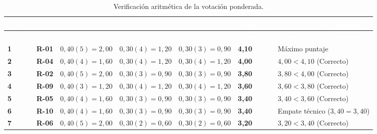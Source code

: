 \documentclass[12pt,a4paper]{article}
\newcommand{\cabecera}[1]{
    \textcolor{white}{\textbf{#1}}
}
\begin{document}
\begin{longtable}{
    C{1.2cm}
    C{1.2cm}
    C{2.1cm}
    C{2.1cm}
    C{2.1cm}
    C{1.6cm}
    C{3.3cm}
}

\caption{Verificación aritmética de la votación ponderada.}
\label{tab:verificacion-votacion}\\

\cabecera{Orden} &
\cabecera{ID} &
\cabecera{$0{,}40\,V$} &
\cabecera{$0{,}30\,R$} &
\cabecera{$0{,}30\,E$} &
\cabecera{Suma ($P$)} &
\cabecera{Estado de ordenamiento} \\

\endfirsthead

\cabecera{Orden} &
\cabecera{ID} &
\cabecera{$0{,}40\,V$} &
\cabecera{$0{,}30\,R$} &
\cabecera{$0{,}30\,E$} &
\cabecera{Suma ($P$)} &
\cabecera{Estado de ordenamiento} \\

\endhead

\bottomrule

\endfoot

\textbf{1} & \textbf{R-01} & $0{,}40(5) = 2{,}00$ & $0{,}30(4) = 1{,}20$ & $0{,}30(3) = 0{,}90$ & \textbf{4{,}10} & Máximo puntaje \\

\textbf{2} & \textbf{R-04} & $0{,}40(4) = 1{,}60$ & $0{,}30(4) = 1{,}20$ & $0{,}30(4) = 1{,}20$ & \textbf{4{,}00} & $4{,}00 < 4{,}10$ (Correcto) \\

\textbf{3} & \textbf{R-02} & $0{,}40(5) = 2{,}00$ & $0{,}30(3) = 0{,}90$ & $0{,}30(3) = 0{,}90$ & \textbf{3{,}80} & $3{,}80 < 4{,}00$ (Correcto) \\

\textbf{4} & \textbf{R-09} & $0{,}40(3) = 1{,}20$ & $0{,}30(4) = 1{,}20$ & $0{,}30(4) = 1{,}20$ & \textbf{3{,}60} & $3{,}60 < 3{,}80$ (Correcto) \\

\textbf{5} & \textbf{R-05} & $0{,}40(4) = 1{,}60$ & $0{,}30(3) = 0{,}90$ & $0{,}30(3) = 0{,}90$ & \textbf{3{,}40} & $3{,}40 < 3{,}60$ (Correcto) \\

\textbf{6} & \textbf{R-10} & $0{,}40(4) = 1{,}60$ & $0{,}30(3) = 0{,}90$ & $0{,}30(3) = 0{,}90$ & \textbf{3{,}40} & Empate técnico ($3{,}40 = 3{,}40$) \\

\textbf{7} & \textbf{R-06} & $0{,}40(5) = 2{,}00$ & $0{,}30(2) = 0{,}60$ & $0{,}30(2) = 0{,}60$ & \textbf{3{,}20} & $3{,}20 < 3{,}40$ (Correcto) \\


\end{longtable}
\end{document}
